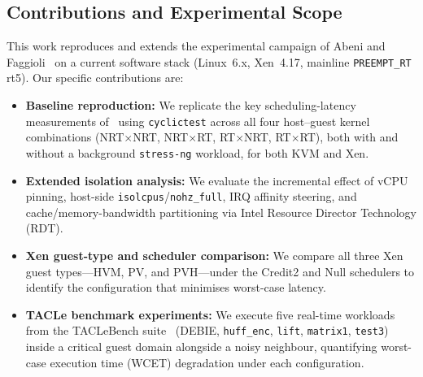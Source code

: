 

\subsection{Contributions and Experimental Scope}
\label{sec:contributions}

This work reproduces and extends the experimental campaign of
Abeni and Faggioli~\cite{abeni2019,abeni2020} on a current software stack
(Linux~6.x, Xen~4.17, mainline \texttt{PREEMPT\_RT} rt5).
Our specific contributions are:

\begin{itemize}
  \item \textbf{Baseline reproduction:} We replicate the key scheduling-latency
        measurements of~\cite{abeni2019} using \texttt{cyclictest} across
        all four host--guest kernel combinations
        (NRT$\times$NRT, NRT$\times$RT, RT$\times$NRT, RT$\times$RT),
        both with and without a background \texttt{stress-ng} workload,
        for both KVM and Xen.

  \item \textbf{Extended isolation analysis:} We evaluate the incremental
        effect of vCPU pinning, host-side \texttt{isolcpus}/\texttt{nohz\_full},
        IRQ affinity steering, and cache/memory-bandwidth partitioning
        via Intel Resource Director Technology (RDT).

  \item \textbf{Xen guest-type and scheduler comparison:} We compare all three
        Xen guest types---HVM, PV, and PVH---under the Credit2 and Null
        schedulers to identify the configuration that minimises worst-case
        latency.

  \item \textbf{TACLe benchmark experiments:} We execute five real-time
        workloads from the TACLeBench suite~\cite{taclebench}
        (DEBIE, \texttt{huff\_enc}, \texttt{lift}, \texttt{matrix1},
        \texttt{test3}) inside a critical guest domain alongside a noisy
        neighbour, quantifying worst-case execution time (WCET) degradation
        under each configuration.

\end{itemize}


